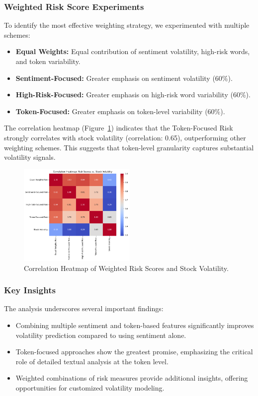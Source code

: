 \documentclass[twocolumn]{article}
\begin{document}
\subsubsection{Weighted Risk Score Experiments}

To identify the most effective weighting strategy, we experimented with multiple schemes:

\begin{itemize}
    \item \textbf{Equal Weights:} Equal contribution of sentiment volatility, high-risk words, and token variability.
    \item \textbf{Sentiment-Focused:} Greater emphasis on sentiment volatility (60\%).
    \item \textbf{High-Risk-Focused:} Greater emphasis on high-risk word variability (60\%).
    \item \textbf{Token-Focused:} Greater emphasis on token-level variability (60\%).
\end{itemize}

The correlation heatmap (Figure~\ref{fig:weighted_risk_heatmap}) indicates that the Token-Focused Risk strongly correlates with stock volatility (correlation: 0.65), outperforming other weighting schemes. This suggests that token-level granularity captures substantial volatility signals.

\begin{figure}[ht]
    \centering
    \includegraphics[width=0.5\textwidth]{weighted_risk_heatmap.png}
    \caption{Correlation Heatmap of Weighted Risk Scores and Stock Volatility.}
    \label{fig:weighted_risk_heatmap}
\end{figure}

\subsubsection{Key Insights}

The analysis underscores several important findings:
\begin{itemize}
    \item Combining multiple sentiment and token-based features significantly improves volatility prediction compared to using sentiment alone.
    \item Token-focused approaches show the greatest promise, emphasizing the critical role of detailed textual analysis at the token level.
    \item Weighted combinations of risk measures provide additional insights, offering opportunities for customized volatility modeling.
\end{itemize}
\end{document}
